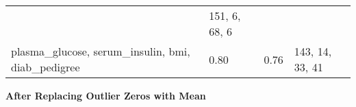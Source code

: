 \documentclass[11pt]{article}
\begin{document}
\begin{longtable}[]{@{}llll@{}}
\begin{minipage}[t]{0.22\columnwidth}
\end{minipage} & \begin{minipage}[t]{0.22\columnwidth}\raggedright
151, 6, 68, 6\strut
\end{minipage}\tabularnewline
\begin{minipage}[t]{0.22\columnwidth}\raggedright
plasma\_glucose, serum\_insulin, bmi, diab\_pedigree\strut
\end{minipage} & \begin{minipage}[t]{0.22\columnwidth}\raggedright
0.80\strut
\end{minipage} & \begin{minipage}[t]{0.22\columnwidth}\raggedright
0.76\strut
\end{minipage} & \begin{minipage}[t]{0.22\columnwidth}\raggedright
143, 14, 33, 41\strut
\end{minipage}\tabularnewline
\bottomrule
\end{longtable}

\textbf{After Replacing Outlier Zeros with Mean}
\end{document}
